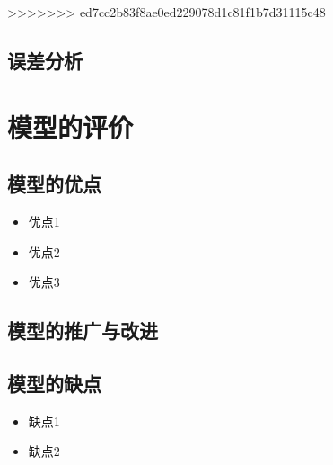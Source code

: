 \documentclass[withoutpreface,bwprint]{cumcm_thesis}
\begin{document}
>>>>>>> ed7cc2b83f8ae0ed229078d1c81f1b7d31115c48
\subsection{误差分析}


\section{模型的评价}

\subsection{模型的优点}
\begin{itemize}[itemindent=2em]
\item 优点1
\item 优点2
\item 优点3
\end{itemize}

\subsection{模型的推广与改进}

\subsection{模型的缺点}
\begin{itemize}[itemindent=2em]
\item 缺点1
\item 缺点2
\end{itemize}

\nocite{*}
\end{document}
